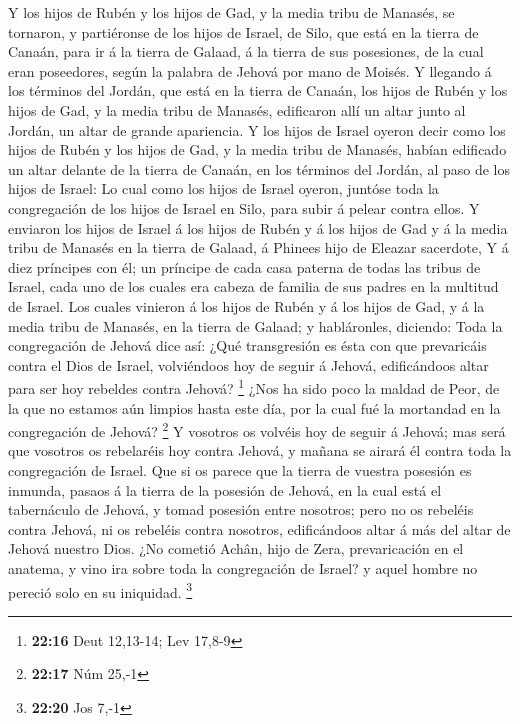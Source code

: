  Y los hijos de Rubén y los hijos de Gad, y la media tribu
de Manasés, se tornaron, y partiéronse de los hijos de Israel, de Silo,
que está en la tierra de Canaán, para ir á la tierra de Galaad, á la
tierra de sus posesiones, de la cual eran poseedores, según la palabra
de Jehová por mano de Moisés.  Y llegando á los términos
del Jordán, que está en la tierra de Canaán, los hijos de Rubén y los
hijos de Gad, y la media tribu de Manasés, edificaron allí un altar
junto al Jordán, un altar de grande apariencia.  Y los
hijos de Israel oyeron decir como los hijos de Rubén y los hijos de Gad,
y la media tribu de Manasés, habían edificado un altar delante de la
tierra de Canaán, en los términos del Jordán, al paso de los hijos de
Israel:  Lo cual como los hijos de Israel oyeron, juntóse
toda la congregación de los hijos de Israel en Silo, para subir á pelear
contra ellos.  Y enviaron los hijos de Israel á los hijos
de Rubén y á los hijos de Gad y á la media tribu de Manasés en la tierra
de Galaad, á Phinees hijo de Eleazar sacerdote,  Y á diez
príncipes con él; un príncipe de cada casa paterna de todas las tribus
de Israel, cada uno de los cuales era cabeza de familia de sus padres en
la multitud de Israel.  Los cuales vinieron á los hijos de
Rubén y á los hijos de Gad, y á la media tribu de Manasés, en la tierra
de Galaad; y habláronles, diciendo:  Toda la congregación
de Jehová dice así: ¿Qué transgresión es ésta con que prevaricáis contra
el Dios de Israel, volviéndoos hoy de seguir á Jehová, edificándoos
altar para ser hoy rebeldes contra Jehová? \footnote{\textbf{22:16} Deut
  12,13-14; Lev 17,8-9}  ¿Nos ha sido poco la maldad de
Peor, de la que no estamos aún limpios hasta este día, por la cual fué
la mortandad en la congregación de Jehová? \footnote{\textbf{22:17} Núm
  25,-1}  Y vosotros os volvéis hoy de seguir á Jehová; mas
será que vosotros os rebelaréis hoy contra Jehová, y mañana se airará él
contra toda la congregación de Israel.  Que si os parece
que la tierra de vuestra posesión es inmunda, pasaos á la tierra de la
posesión de Jehová, en la cual está el tabernáculo de Jehová, y tomad
posesión entre nosotros; pero no os rebeléis contra Jehová, ni os
rebeléis contra nosotros, edificándoos altar á más del altar de Jehová
nuestro Dios.  ¿No cometió Achân, hijo de Zera,
prevaricación en el anatema, y vino ira sobre toda la congregación de
Israel? y aquel hombre no pereció solo en su iniquidad. \footnote{\textbf{22:20}
  Jos 7,-1}

